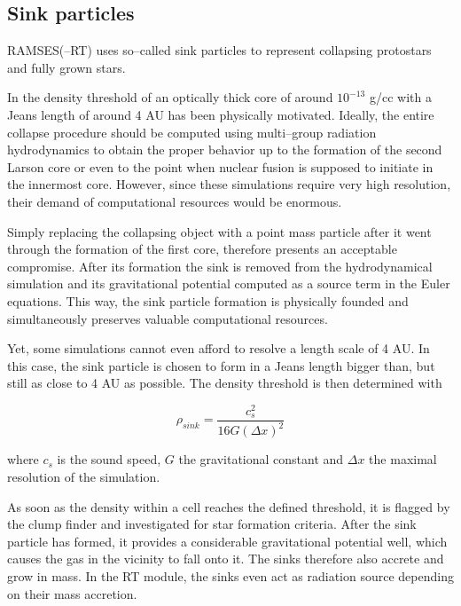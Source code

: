 \subsection{Sink particles}
\label{subsec:Sink_particles}

RAMSES(--RT) uses so--called sink particles to represent collapsing protostars and fully grown stars.

In  the density threshold of an optically thick core of around $10^{-13}$ g/cc with a Jeans length of around 4 AU has been physically motivated.
Ideally, the entire collapse procedure should be computed using multi--group radiation hydrodynamics to obtain the proper behavior up to the formation of the second Larson core or even to the point when nuclear fusion is supposed to initiate in the innermost core.
However, since these simulations require very high resolution, their demand of computational resources would be enormous.

Simply replacing the collapsing object with a point mass particle after it went through the formation of the first core, therefore presents an acceptable compromise.
After its formation the sink is removed from the hydrodynamical simulation and its gravitational potential computed as a source term in the Euler equations.
This way, the sink particle formation is physically founded and simultaneously preserves valuable computational resources.

Yet, some simulations cannot even afford to resolve a length scale of 4 AU.
In this case, the sink particle is chosen to form in a Jeans length bigger than, but still as close to 4 AU as possible.
The density threshold is then determined with

\begin{equation}
 \rho_{sink} = \frac{c_{s}^{2}}{16G(\Delta x)^{2}}
 \label{eq:rho_sink}
\end{equation}

where $c_{s}$ is the sound speed, $G$ the gravitational constant and $\Delta x$ the maximal resolution of the simulation.

As soon as the density within a cell reaches the defined threshold, it is flagged by the clump finder and investigated for star formation criteria.
After the sink particle has formed, it provides a considerable gravitational potential well, which causes the gas in the vicinity to fall onto it.
The sinks therefore also accrete and grow in mass.
In the RT module, the sinks even act as radiation source depending on their mass accretion.
